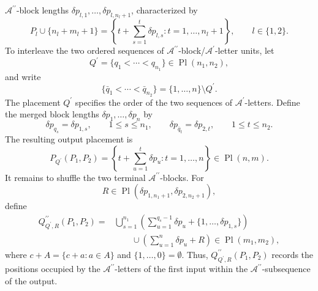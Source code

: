 \documentclass{amsart}
\theoremstyle{definition}
\theoremstyle{remark}
\begin{document}
$\mathcal{A}^{\prime\prime}$-block lengths
$\delta p_{l,1},\ldots,\delta p_{l,n_l+1}$, characterized by
\[
    P_l\cup\{n_l+m_l+1\}
    =
    \left\{
        t+\sum_{s=1}^{t}\delta p_{l,s}
        :
        t=1,\ldots,n_l+1
    \right\},
    \qquad
    l\in\{1,2\}.
\]
To interleave the two ordered sequences of
$\mathcal{A}^{\prime\prime}$-block/$\mathcal{A}^{\prime}$-letter units,
let
\[
    Q^{\prime}
    =
    \{q_1<\cdots<q_{n_1}\}
    \in
    \operatorname{Pl}(n_1,n_2),
\]
and write
\[
    \{\bar q_1<\cdots<\bar q_{n_2}\}
    =
    \{1,\ldots,n\}\setminus Q^{\prime}.
\]
The placement $Q^{\prime}$ specifies the order of the two sequences of
$\mathcal{A}^{\prime}$-letters. Define the merged block lengths
$\delta p_1,\ldots,\delta p_n$ by
\[
    \delta p_{q_s}
    =
    \delta p_{1,s},
    \qquad
    1\leq s\leq n_1,
    \qquad
    \delta p_{\bar q_t}
    =
    \delta p_{2,t},
    \qquad
    1\leq t\leq n_2.
\]
The resulting output placement is
\[
    P_{Q^{\prime}}(P_1,P_2)
    =
    \left\{
        t+\sum_{u=1}^{t}\delta p_u
        :
        t=1,\ldots,n
    \right\}
    \in
    \operatorname{Pl}(n,m).
\]
It remains to shuffle the two terminal
$\mathcal{A}^{\prime\prime}$-blocks. For
\[
    R
    \in
    \operatorname{Pl}
    \left(
        \delta p_{1,n_1+1},
        \delta p_{2,n_2+1}
    \right),
\]
define
\[
\begin{aligned}
    Q^{\prime\prime}_{Q^{\prime},R}(P_1,P_2)
    =
    &
    \bigcup_{s=1}^{n_1}
    \left(
        \sum_{u=1}^{q_s-1}\delta p_u
        +
        \{1,\ldots,\delta p_{1,s}\}
    \right)
    \\
    &\qquad
    \cup
    \left(
        \sum_{u=1}^{n}\delta p_u
        +
        R
    \right)
    \in
    \operatorname{Pl}(m_1,m_2),
\end{aligned}
\]
where $c+A=\{c+a:a\in A\}$ and
$\{1,\ldots,0\}=\emptyset$. Thus,
$Q^{\prime\prime}_{Q^{\prime},R}(P_1,P_2)$ records the positions occupied
by the $\mathcal{A}^{\prime\prime}$-letters of the first input within the
$\mathcal{A}^{\prime\prime}$-subsequence of the output.
\end{document}

